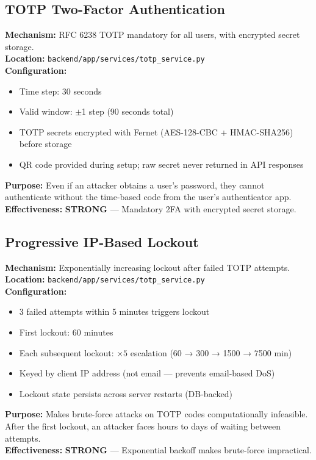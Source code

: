\documentclass[11pt,a4paper]{article}
\begin{document}
\subsection{TOTP Two-Factor Authentication}

\begin{tcolorbox}[colback=shieldgreen!5, colframe=shieldgreen]
\textbf{Mechanism:} RFC 6238 TOTP mandatory for all users, with encrypted secret storage.\\
\textbf{Location:} \texttt{backend/app/services/totp\_service.py}\\
\textbf{Configuration:}
\begin{itemize}[nosep]
  \item Time step: 30 seconds
  \item Valid window: $\pm$1 step (90 seconds total)
  \item TOTP secrets encrypted with Fernet (AES-128-CBC + HMAC-SHA256) before storage
  \item QR code provided during setup; raw secret never returned in API responses
\end{itemize}
\textbf{Purpose:} Even if an attacker obtains a user's password, they cannot authenticate without the time-based code from the user's authenticator app.\\
\textbf{Effectiveness:} \textcolor{shieldgreen}{\textbf{STRONG}} — Mandatory 2FA with encrypted secret storage.
\end{tcolorbox}

\subsection{Progressive IP-Based Lockout}

\begin{tcolorbox}[colback=shieldgreen!5, colframe=shieldgreen]
\textbf{Mechanism:} Exponentially increasing lockout after failed TOTP attempts.\\
\textbf{Location:} \texttt{backend/app/services/totp\_service.py}\\
\textbf{Configuration:}
\begin{itemize}[nosep]
  \item 3 failed attempts within 5 minutes triggers lockout
  \item First lockout: 60 minutes
  \item Each subsequent lockout: $\times 5$ escalation (60 → 300 → 1500 → 7500 min)
  \item Keyed by client IP address (not email — prevents email-based DoS)
  \item Lockout state persists across server restarts (DB-backed)
\end{itemize}
\textbf{Purpose:} Makes brute-force attacks on TOTP codes computationally infeasible. After the first lockout, an attacker faces hours to days of waiting between attempts.\\
\textbf{Effectiveness:} \textcolor{shieldgreen}{\textbf{STRONG}} — Exponential backoff makes brute-force impractical.
\end{tcolorbox}
\end{document}
